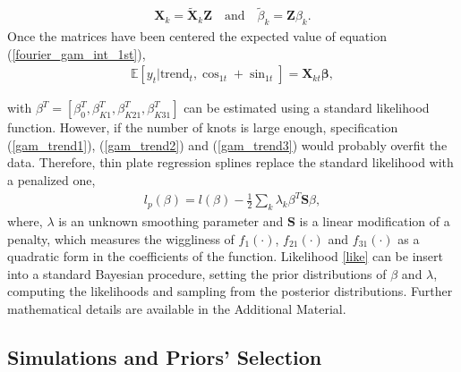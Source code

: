\documentclass{article}\usepackage[]{graphicx}\usepackage[]{color}
\begin{document}
\begin{align*}\label{}
\mathbf{X}_{k} = \mathbf{\tilde{X}}_{k}\mathbf{Z} \quad \text{and} \quad \tilde{\beta}_{k} = \mathbf{Z}\beta_{k}.
\end{align*}
Once the matrices have been centered the expected value of equation (\ref{fourier_gam_int_1st}),
\begin{align}\label{conditional exp}
\mathbb{E}[y_{t} | \text{trend}_{t}, \cos_{1t} + \sin_{1t}] = \mathbf{X}_{kt} \mathbf{\beta},
\end{align}

with $\beta^{T} = [\beta_{0}^{T}, \beta_{K1}^{T}, \beta_{K21}^{T}, \beta_{K31}^{T}] $ can be estimated using a standard likelihood function. However, if the number of knots is large enough, specification (\ref{gam_trend1}), (\ref{gam_trend2}) and (\ref{gam_trend3}) would probably overfit the data. Therefore, thin plate regression splines replace the standard likelihood with a penalized one, 
\begin{align}\label{like}
l_{p}(\beta)=l(\beta)-\frac{1}{2}\sum_{k}\lambda_{k}\beta^{T} \mathbf{S} \beta,
\end{align}
where, $ \lambda $ is an unknown smoothing parameter and $ \mathbf{S} $ is a linear modification of a penalty, which measures the wiggliness of $f_{1}(\cdot)$, $f_{21}(\cdot) $ and $ f_{31}(\cdot) $ as a quadratic form in the coefficients of the function. Likelihood \ref{like} can be insert into a standard Bayesian procedure, setting the prior distributions of $\beta$ and $\lambda$, computing the likelihoods and sampling from the posterior distributions. Further mathematical details are available in the Additional Material.     


\subsection{Simulations and Priors' Selection}\label{prior_sim}
\end{document}
